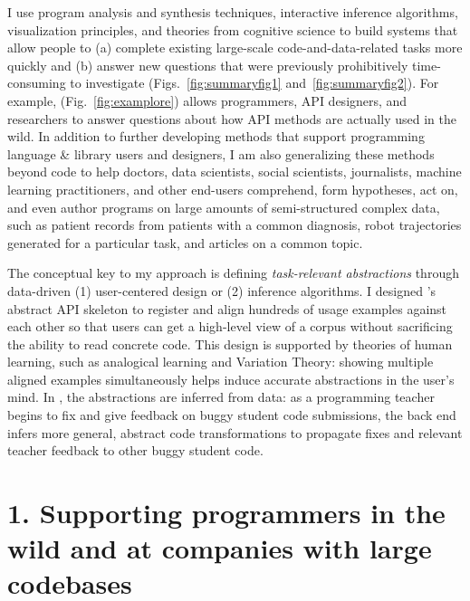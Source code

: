 \documentclass[justified]{tufte-handout}
\begin{document}
I use program analysis and synthesis techniques, interactive inference algorithms, visualization principles, and theories from cognitive science to build systems that allow people to (a) complete existing large-scale code-and-data-related tasks more quickly and (b) answer new questions that were previously prohibitively time-consuming to investigate (Figs.~\ref{fig:summaryfig1} and~\ref{fig:summaryfig2}). 
For example,  (Fig.~\ref{fig:examplore}) allows programmers, API designers, and researchers to answer questions about how API methods are actually used in the wild.\cite{examplore} In addition to further developing methods that support programming language \& library users and designers, I am also generalizing these methods beyond code to help doctors, data scientists, social scientists, journalists, machine learning practitioners, and other end-users comprehend, form hypotheses, act on, and even author programs on large amounts of semi-structured complex data, such as patient records from patients with a common diagnosis, robot trajectories generated for a particular task, and articles on a common topic.%

The conceptual key to my approach is defining \emph{task-relevant abstractions} through data-driven (1) user-centered design or (2) inference algorithms. I designed 's abstract API skeleton to register and align hundreds of usage examples against each other so that users can get a high-level view of a corpus without sacrificing the ability to read concrete code. This design is supported by theories of human learning, such as analogical learning and Variation Theory: showing multiple aligned examples simultaneously helps induce accurate abstractions in the user's mind. In , the abstractions are inferred from data: as a programming teacher begins to fix and give feedback on buggy student code submissions, the back end infers more general, abstract code transformations to propagate fixes and relevant teacher feedback to other buggy student code.\cite{lats17} 

\section{1. Supporting programmers in the wild and at companies with large codebases}
\end{document}
